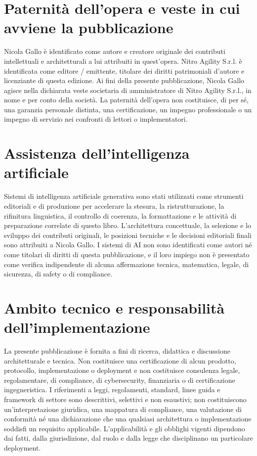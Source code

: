 \documentclass[10pt,oneside,openany]{book}
\begin{document}
\section{Paternità dell'opera e veste in cui avviene la pubblicazione}
Nicola Gallo è identificato come autore e creatore originale dei contributi intellettuali e architetturali a lui attribuiti in quest'opera. Nitro Agility S.r.l. è identificata come editore / emittente, titolare dei diritti patrimoniali d'autore e licenziante di questa edizione. Ai fini della presente pubblicazione, Nicola Gallo agisce nella dichiarata veste societaria di amministratore di Nitro Agility S.r.l., in nome e per conto della società. La paternità dell'opera non costituisce, di per sé, una garanzia personale distinta, una certificazione, un impegno professionale o un impegno di servizio nei confronti di lettori o implementatori.

\section{Assistenza dell'intelligenza artificiale}
Sistemi di intelligenza artificiale generativa sono stati utilizzati come strumenti editoriali e di produzione per accelerare la stesura, la ristrutturazione, la rifinitura linguistica, il controllo di coerenza, la formattazione e le attività di preparazione correlate di questo libro. L'architettura concettuale, la selezione e lo sviluppo dei contributi originali, le posizioni tecniche e le decisioni editoriali finali sono attribuiti a Nicola Gallo. I sistemi di AI non sono identificati come autori né come titolari di diritti di questa pubblicazione, e il loro impiego non è presentato come verifica indipendente di alcuna affermazione tecnica, matematica, legale, di sicurezza, di safety o di compliance.

\section{Ambito tecnico e responsabilità dell'implementazione}
La presente pubblicazione è fornita a fini di ricerca, didattica e discussione architetturale e tecnica. Non costituisce una certificazione di alcun prodotto, protocollo, implementazione o deployment e non costituisce consulenza legale, regolamentare, di compliance, di cybersecurity, finanziaria o di certificazione ingegneristica. I riferimenti a leggi, regolamenti, standard, linee guida e framework di settore sono descrittivi, selettivi e non esaustivi; non costituiscono un'interpretazione giuridica, una mappatura di compliance, una valutazione di conformità né una dichiarazione che una qualsiasi architettura o implementazione soddisfi un requisito applicabile. L'applicabilità e gli obblighi vigenti dipendono dai fatti, dalla giurisdizione, dal ruolo e dalla legge che disciplinano un particolare deployment.
\end{document}
